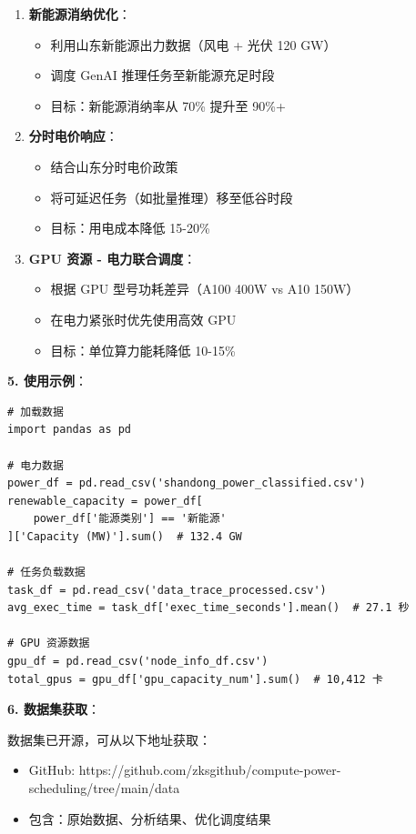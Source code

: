 \documentclass[12pt,a4paper]{article}
\begin{document}
\begin{enumerate}
    \item \textbf{新能源消纳优化}：
    \begin{itemize}
        \item 利用山东新能源出力数据（风电 + 光伏 120 GW）
        \item 调度 GenAI 推理任务至新能源充足时段
        \item 目标：新能源消纳率从 70\% 提升至 90\%+
    \end{itemize}
    
    \item \textbf{分时电价响应}：
    \begin{itemize}
        \item 结合山东分时电价政策
        \item 将可延迟任务（如批量推理）移至低谷时段
        \item 目标：用电成本降低 15-20\%
    \end{itemize}
    
    \item \textbf{GPU 资源 - 电力联合调度}：
    \begin{itemize}
        \item 根据 GPU 型号功耗差异（A100 400W vs A10 150W）
        \item 在电力紧张时优先使用高效 GPU
        \item 目标：单位算力能耗降低 10-15\%
    \end{itemize}
\end{enumerate}

\textbf{5. 使用示例}：

\begin{verbatim}
# 加载数据
import pandas as pd

# 电力数据
power_df = pd.read_csv('shandong_power_classified.csv')
renewable_capacity = power_df[
    power_df['能源类别'] == '新能源'
]['Capacity (MW)'].sum()  # 132.4 GW

# 任务负载数据
task_df = pd.read_csv('data_trace_processed.csv')
avg_exec_time = task_df['exec_time_seconds'].mean()  # 27.1 秒

# GPU 资源数据
gpu_df = pd.read_csv('node_info_df.csv')
total_gpus = gpu_df['gpu_capacity_num'].sum()  # 10,412 卡
\end{verbatim}

\textbf{6. 数据集获取}：

数据集已开源，可从以下地址获取：
\begin{itemize}
    \item GitHub: https://github.com/zksgithub/compute-power-scheduling/tree/main/data
    \item 包含：原始数据、分析结果、优化调度结果
\end{itemize}
\end{document}
